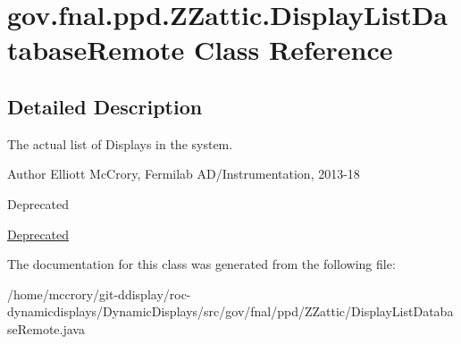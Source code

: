 \hypertarget{classgov_1_1fnal_1_1ppd_1_1ZZattic_1_1DisplayListDatabaseRemote}{\section{gov.\-fnal.\-ppd.\-Z\-Zattic.\-Display\-List\-Database\-Remote Class Reference}
\label{classgov_1_1fnal_1_1ppd_1_1ZZattic_1_1DisplayListDatabaseRemote}
}


\subsection{Detailed Description}
The actual list of Displays in the system.

\begin{DoxyAuthor}{Author}
Elliott Mc\-Crory, Fermilab A\-D/\-Instrumentation, 2013-\/18 
\end{DoxyAuthor}
\begin{DoxyRefDesc}{Deprecated}
\item[\hyperlink{deprecated__deprecated000011}{Deprecated}]\end{DoxyRefDesc}


The documentation for this class was generated from the following file\-:\begin{DoxyCompactItemize}
\item 
/home/mccrory/git-\/ddisplay/roc-\/dynamicdisplays/\-Dynamic\-Displays/src/gov/fnal/ppd/\-Z\-Zattic/Display\-List\-Database\-Remote.\-java\end{DoxyCompactItemize}
